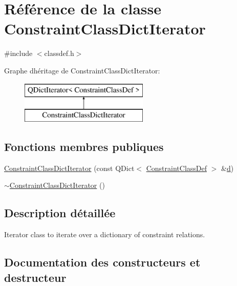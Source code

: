 \hypertarget{class_constraint_class_dict_iterator}{}\section{Référence de la classe Constraint\+Class\+Dict\+Iterator}
\label{class_constraint_class_dict_iterator}


{\ttfamily \#include $<$classdef.\+h$>$}

Graphe d\textquotesingle{}héritage de Constraint\+Class\+Dict\+Iterator\+:\begin{figure}[H]
\begin{center}
\leavevmode
\includegraphics[height=2.000000cm]{class_constraint_class_dict_iterator}
\end{center}
\end{figure}
\subsection*{Fonctions membres publiques}
\begin{DoxyCompactItemize}
\item 
\hyperlink{class_constraint_class_dict_iterator_a1c31f9a44ed1331824400660e3092df9}{Constraint\+Class\+Dict\+Iterator} (const Q\+Dict$<$ \hyperlink{struct_constraint_class_def}{Constraint\+Class\+Def} $>$ \&\hyperlink{060__command__switch_8tcl_af43f4b1f0064a33b2d662af9f06d3a00}{d})
\item 
\hyperlink{class_constraint_class_dict_iterator_ab9d9f402109cbde3d535128965dc415e}{$\sim$\+Constraint\+Class\+Dict\+Iterator} ()
\end{DoxyCompactItemize}


\subsection{Description détaillée}
Iterator class to iterate over a dictionary of constraint relations. 

\subsection{Documentation des constructeurs et destructeur}
\hypertarget{class_constraint_class_dict_iterator_a1c31f9a44ed1331824400660e3092df9}{}
